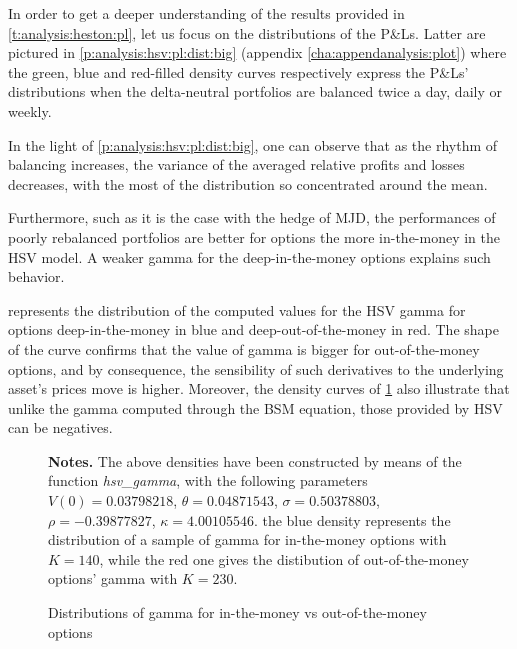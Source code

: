 \documentclass[12pt,a4paper]{report}
\begin{document}
In order to get a deeper understanding of the results provided in \cref{t:analysis:heston:pl}, let us focus on the distributions of the P\&Ls. 
Latter are pictured in \cref{p:analysis:hsv:pl:dist:big} (appendix \cref{cha:appendanalysis:plot}) where the green, blue and red-filled density curves respectively express the P\&Ls' distributions when the delta-neutral portfolios are balanced twice a day, daily or weekly.




         

In the light of \cref{p:analysis:hsv:pl:dist:big}, one can observe that as the rhythm of balancing increases, the variance of the averaged relative profits and losses decreases, with the most of the distribution so concentrated around the mean.



Furthermore, such as it is the case with the hedge of MJD, the performances of poorly rebalanced portfolios are better for options the more in-the-money in the HSV model. 
A weaker gamma for the deep-in-the-money options explains such behavior.

 represents the distribution of the computed values for the HSV gamma for options deep-in-the-money in blue and deep-out-of-the-money in red.
The shape of the curve confirms that the value of gamma is bigger for out-of-the-money options, and by consequence, the sensibility of such derivatives to the underlying asset's prices move is higher.
Moreover, the density curves of \cref{p:analysis:hsv:gamma} also illustrate that unlike the gamma computed through the BSM equation, those provided by HSV can be negatives.




\begin{figure}[h]
  \centering
  
  \caption{Distributions of gamma for in-the-money vs out-of-the-money options}
  \begin{changemargin}{0.5cm}{0.5cm}
  \medskip
\footnotesize
{}\textbf{Notes.} The above densities have been constructed by means of the function \textit{hsv\_gamma}, with the following parameters $V(0) = 0.03798218$, $\theta = 0.04871543$, $\sigma = 0.50378803$, $\rho = -0.39877827$, $\kappa = 4.00105546$. the blue density represents the distribution of a sample of gamma for in-the-money options with $K = 140$, while the red one gives the distibution of out-of-the-money options' gamma with $K = 230$.
  \end{changemargin}
  \label{p:analysis:hsv:gamma}
\end{figure}
\end{document}
